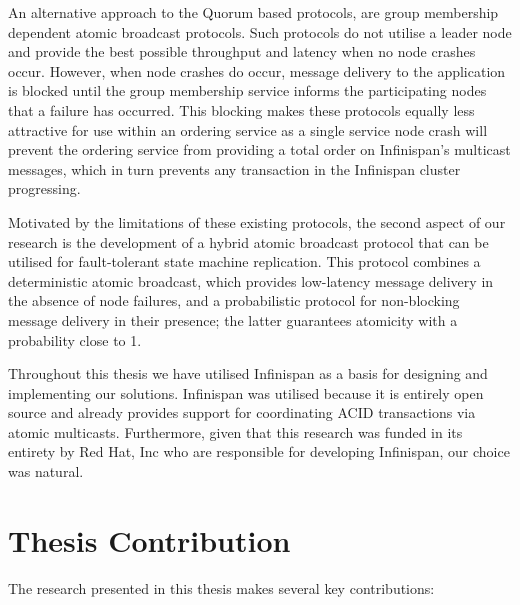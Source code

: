     An alternative approach to the Quorum based protocols, are group membership dependent atomic broadcast protocols.  Such protocols do not utilise a leader node and provide the best possible throughput and latency when no node crashes occur.  However, when node crashes do occur, message delivery to the application is blocked until the group membership service informs the participating nodes that a failure has occurred.  This blocking makes these protocols equally less attractive for use within an ordering service as a single service node crash will prevent the ordering service from providing a total order on Infinispan's multicast messages, which in turn prevents any transaction in the Infinispan cluster progressing.  

    Motivated by the limitations of these existing protocols, the second aspect of our research is the development of a hybrid atomic broadcast protocol that can be utilised for fault-tolerant state machine replication.  This protocol combines a deterministic atomic broadcast, which provides low-latency message delivery in the absence of node failures, and a probabilistic protocol for non-blocking message delivery in their presence; the latter guarantees atomicity with a probability close to 1.
   
   Throughout this thesis we have utilised Infinispan as a basis for designing and implementing our solutions.  Infinispan was utilised because it is entirely open source and already provides support for coordinating ACID transactions via atomic multicasts.  Furthermore, given that this research was funded in its entirety by Red Hat, Inc who are responsible for developing Infinispan, our choice was natural.  
   
    \section{Thesis Contribution}
    The research presented in this thesis makes several key contributions:
    
